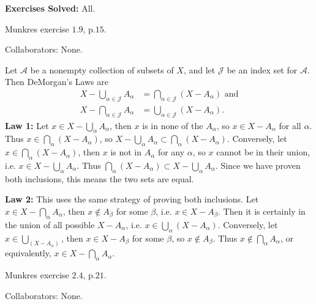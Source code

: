 \documentclass[11pt]{article}
\begin{document}
{\color{blue}\textbf{Exercises Solved:} All.}

\begin{exer}[3 points]
	Munkres exercise $1.9$, p.$15$.
\end{exer}
{\color{blue}Collaborators: None.}

Let $\mathcal{A}$ be a nonempty collection of subsets of $X$, and let $\mathcal{J}$ be an index set for $\mathcal{A}$. Then DeMorgan's Laws are
\begin{align*}
	X - \bigcup_{\alpha\in\mathcal{J}}A_{\alpha} &= \bigcap_{\alpha\in\mathcal{J}}(X-A_{\alpha}) \text{ and} \\
	X - \bigcap_{\alpha\in\mathcal{J}}A_{\alpha} &= \bigcup_{\alpha\in\mathcal{J}}(X-A_{\alpha}).
\end{align*}
\textbf{Law 1:} Let $x \in X-\bigcup_{\alpha}A_{\alpha}$, then $x$ is in none of the $A_{\alpha}$, so $x \in X-A_{\alpha}$ for all $\alpha$. Thus $x \in \bigcap_{\alpha}(X-A_{\alpha})$, so $X-\bigcup_{\alpha}A_{\alpha} \subset \bigcap_{\alpha}(X-A_{\alpha})$. Conversely, let $x \in \bigcap_{\alpha}(X-A_{\alpha})$, then $x$ is not in $A_{\alpha}$ for any $\alpha$, so $x$ cannot be in their union, i.e. $x \in X - \bigcup_{\alpha}A_{\alpha}$. Thus $\bigcap_{\alpha}(X-A_{\alpha}) \subset  X-\bigcup_{\alpha}A_{\alpha}$. Since we have proven both inclusions, this means the two sets are equal.

\textbf{Law 2:} This uses the same strategy of proving both inclusions. Let $x \in X-\bigcap_{\alpha}A_{\alpha}$, then $x \not\in A_{\beta}$ for some $\beta$, i.e. $x \in X-A_{\beta}$. Then it is certainly in the union of all possible $X-A_\alpha$, i.e. $x \in \bigcup_{\alpha}(X-A_{\alpha})$. Conversely, let $x \in \bigcup_{(X-A_{\alpha})}$, then $x \in X-A_{\beta}$ for some $\beta$, so $x \not\in A_{\beta}$. Thus $x \not\in \bigcap_{\alpha}A_{\alpha}$, or equivalently, $x \in X-\bigcap_{\alpha}A_{\alpha}.$


\begin{exer}[6 points]
	Munkres exercise $2.4$, p.$21$.
\end{exer}
{\color{blue}Collaborators: None.}
\end{document}
